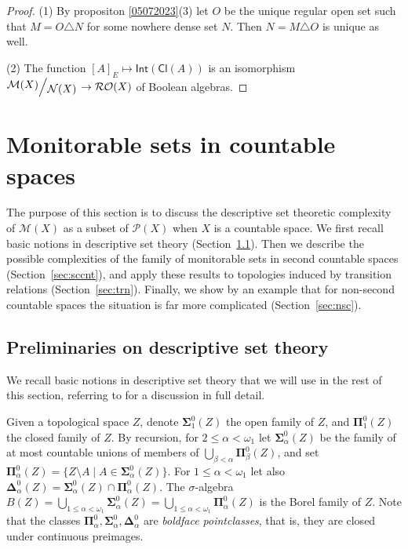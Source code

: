 \documentclass{lmcs}
\newcommand{\bsigma}{\boldsymbol\Sigma}
\newcommand{\bpi}{\boldsymbol\Pi}
\newcommand{\bdelta}{\boldsymbol\Delta}
\newcommand{\quot}[2]{{\raisebox{.2em}{$#1\!$}\left/\raisebox{-.2em}{$#2$}\right.}}
\newcommand{\Cl}[1]{\mathsf{Cl}(#1)}
\newcommand{\Int}[1]{\mathsf{Int}(#1)}
\begin{document}
\begin{proof}
(1) By propositon \ref{05072023}(3) let $O$ be the unique regular open set such that $M=O\triangle N$ for some nowhere dense set $N$.
Then $N=M\triangle O$ is unique as well.

(2) The function $[A]_E\mapsto \Int{ \Cl{A} } $ is an isomorphism $ \quot{ \mathcal M (X)}{ \mathcal N (X)} \to \mathcal R \mathcal O (X)$ of Boolean algebras.
\end{proof}


\section{Monitorable sets in countable spaces}
 \label{sec:cntbl}

The purpose of this section is to discuss the descriptive set theoretic complexity of $ \mathcal M (X)$ as a subset of $ \mathcal P (X)$ when $X$ is a countable space. 
We first recall basic notions  in descriptive set theory (Section~\ref{sec:basics-top}). 
Then we describe the possible complexities of the family of monitorable sets in second countable spaces (Section~\ref{sec:sccnt}), and apply these results to topologies induced by transition relations (Section~\ref{sec:trn}). 
Finally, we show by an example that for non-second countable spaces the situation is far more complicated (Section~\ref{sec:nsc}). 

\subsection{Preliminaries on descriptive set theory}
\label{sec:basics-top}

We recall basic notions in descriptive set theory that we will use in the rest of this section, referring to \cite{Kechris1995} for a discussion in full detail.

Given a topological space $Z$, denote $ \bsigma^0_1(Z)$ the open family of $Z$, and $ \bpi^0_1(Z)$ the closed family of $Z$.
By recursion, for $2\leqslant\alpha <\omega_1$ let $ \bsigma^0_{\alpha }(Z)$ be the family of at most countable unions of members of $\bigcup_{\beta <\alpha } \bpi^0_{\beta }(Z)$, and set $ \bpi^0_{\alpha }(Z)=\{ Z\setminus A\mid A\in \bsigma^0_{\alpha }(Z)\} $.
For $1\leqslant\alpha <\omega_1$ let also $ \bdelta^0_{\alpha }(Z)= \bsigma^0_{\alpha }(Z)\cap \bpi^0_{\alpha }(Z)$.
The $\sigma $-algebra $B(Z)=\bigcup_{1\leqslant\alpha <\omega_1} \bsigma^0_{\alpha }(Z)=\bigcup_{1\le\alpha <\omega_1} \bpi^0_{\alpha }(Z)$ is the Borel family of $Z$.
Note that the classes $ \bpi^0_{\alpha }, \bsigma^0_{\alpha }, \bdelta^0_{\alpha }$ are \emph{boldface pointclasses}, that is, they are closed under continuous preimages.
\end{document}
